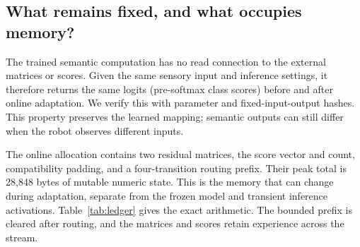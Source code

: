 \subsection{What remains fixed, and what occupies memory?}
The trained semantic computation has no read connection to the external
matrices or scores. Given the same sensory input and inference settings,
it therefore returns the same logits (pre-softmax class scores) before and
after online adaptation.
We verify this with parameter and fixed-input-output hashes. This property
preserves the learned mapping; semantic outputs can still differ when the
robot observes different inputs.

The online allocation contains two residual matrices, the score vector and
count, compatibility padding, and a four-transition routing prefix. Their peak
total is 28,848 bytes of mutable numeric state. This is the memory that can
change during adaptation, separate from the frozen model and transient
inference activations. Table~\ref{tab:ledger} gives the exact arithmetic.
The bounded prefix is cleared after routing, and the matrices and scores retain
experience across the stream.
